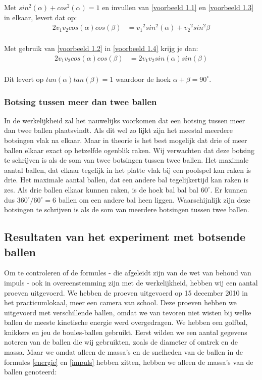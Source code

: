 \documentclass[12pt,a4paper]{article}
\begin{document}
	Met $sin^2(\alpha)+cos^2(\alpha)=1$ en invullen van \eqref{voorbeeld 1.1} en \eqref{voorbeeld 1.3} in elkaar, levert dat op:
	\begin{equation}
	\begin{aligned}
	\label{voorbeeld 1.4}
		2v_1v_2cos(\alpha)cos(\beta)&={v_1}^2sin^2(\alpha)+{v_2}^2sin^2{\beta}\\
	\end{aligned}
	\end{equation}

	Met gebruik van \eqref{voorbeeld 1.2} in \eqref{voorbeeld 1.4} krijg je dan:
	\begin{equation}
	\begin{aligned}
	\label{voorbeeld 1.5}
		2v_1v_2cos(\alpha)cos(\beta)&=2v_1v_2sin(\alpha)sin(\beta)\\
	\end{aligned}
	\end{equation}

	Dit levert op $tan(\alpha)tan(\beta)=1$ waardoor de hoek $\alpha+\beta=90^{\circ}$.

	\subsubsection{Botsing tussen meer dan twee ballen}
	In de werkelijkheid zal het nauwelijks voorkomen dat een botsing tussen meer dan twee ballen plaatsvindt. Als dit wel zo lijkt zijn het meestal meerdere botsingen vlak na elkaar. Maar in theorie is het best mogelijk dat drie of meer ballen elkaar exact op hetzelfde ogenblik raken. Wij verwachten dat deze botsing te schrijven is als de som van twee botsingen tussen twee ballen.
	Het maximale aantal ballen, dat elkaar tegelijk in het platte vlak bij een poolspel kan raken is drie. Het maximale aantal ballen, dat een andere bal tegelijkertijd kan raken is zes. Als drie ballen elkaar kunnen raken, is de hoek bal bal bal $60^{\circ}$. Er kunnen dus $360^{\circ}/60^{\circ} = 6$ ballen om een andere bal heen liggen. Waarschijnlijk zijn deze botsingen te schrijven is als de som van meerdere botsingen tussen twee ballen.

	\subsection{Resultaten van het experiment met botsende ballen}
	Om te controleren of de formules - die afgeleidt zijn van de wet van behoud van impuls - ook in overeenstemming zijn met de werkelijkheid, hebben wij een aantal proeven uitgevoerd. We hebben de proeven uitgevoerd op 15 december 2010 in het practicumlokaal, meer een camera van school. Deze proeven hebben we uitgevoerd met verschillende ballen, omdat we van tevoren niet wisten bij welke ballen de meeste kinetische energie werd overgedragen. We hebben een golfbal, knikkers en jeu de boules-ballen gebruikt. Eerst wilden we een aantal gegevens noteren van de ballen die wij gebruikten, zoals de diameter of omtrek en de massa. Maar we omdat alleen de massa's en de snelheden van de ballen in de formules \eqref{energie} en \eqref{impuls} hebben zitten, hebben we alleen de massa's van de ballen genoteerd:
\end{document}
